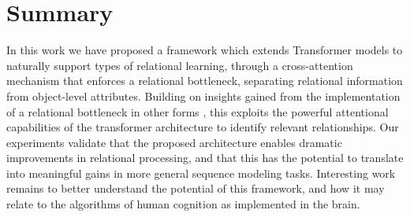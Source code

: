 \section{Summary}\label{sec:discuss}

In this work we have proposed a framework which extends Transformer models to naturally support types of relational learning, through a cross-attention mechanism that enforces a relational bottleneck, separating relational information from object-level attributes. Building on insights gained from the implementation of a relational bottleneck in other forms \citep{esbn, kerg2022neural}, this exploits the powerful attentional capabilities of the transformer architecture to identify relevant relationships. Our experiments validate that the proposed architecture enables dramatic improvements in relational processing, and that this has the potential to translate into meaningful gains in more general sequence modeling tasks.
Interesting work remains to better understand the potential of this framework, and how it may relate to the algorithms of human cognition as implemented in the brain.
